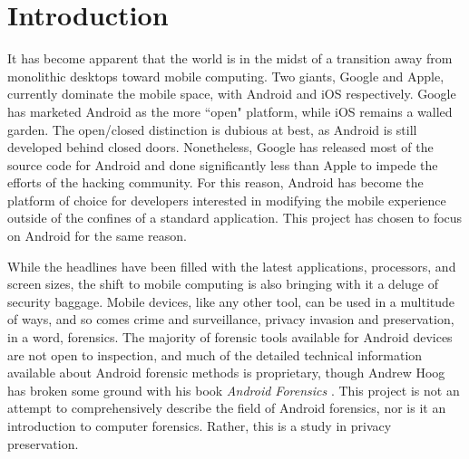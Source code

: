 \chapter{Introduction}
\label{ch:introduction}

It has become apparent that the world is in the midst of a transition away from monolithic desktops toward mobile computing.  Two
giants, Google and Apple, currently dominate the mobile space, with Android and iOS respectively.  Google has marketed Android as
the more ``open" platform, while iOS remains a walled garden.  The open/closed distinction is dubious at best, as Android is still
developed behind closed doors.  Nonetheless, Google has released most of the source code for Android and done significantly less
than Apple to impede the efforts of the hacking community. For this reason, Android has become the platform of choice for developers
interested in modifying the mobile experience outside of the confines of a standard application.  This project has chosen to focus
on Android for the same reason.

While the headlines have been filled with the latest applications, processors, and screen sizes, the shift to mobile computing is also
bringing with it a deluge of security baggage. Mobile devices, like any other tool, can be used in a multitude of ways, and so comes
crime and surveillance, privacy invasion and preservation, in a word, forensics. The majority of forensic tools available for Android
devices are not open to inspection, and much of the detailed technical information available about Android forensic methods is
proprietary, though Andrew Hoog has broken some ground with his book \emph{Android Forensics} \cite{hoog}. This project is not an
attempt to comprehensively describe the field of Android forensics, nor is it an introduction to computer forensics. Rather, this is
a study in privacy preservation.

